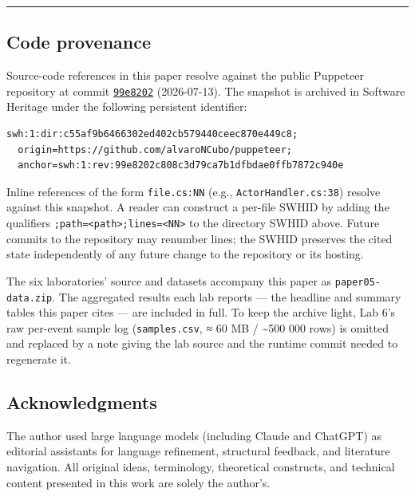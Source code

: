 \documentclass[
]{article}
\begin{document}
\begin{center}\rule{0.5\linewidth}{0.5pt}\end{center}

\subsection{Code provenance}\label{code-provenance}

Source-code references in this paper resolve against the public
Puppeteer repository at commit
\href{https://github.com/alvaroNCubo/puppeteer/tree/99e8202c808c3d79ca7b1dfbdae0ffb7872c940e}{\texttt{99e8202}}
(2026-07-13). The snapshot is archived in Software Heritage under the
following persistent identifier:

\begin{verbatim}
swh:1:dir:c55af9b6466302ed402cb579440ceec870e449c8;
  origin=https://github.com/alvaroNCubo/puppeteer;
  anchor=swh:1:rev:99e8202c808c3d79ca7b1dfbdae0ffb7872c940e
\end{verbatim}

Inline references of the form \texttt{file.cs:NN} (e.g.,
\texttt{ActorHandler.cs:38}) resolve against this snapshot. A reader can
construct a per-file SWHID by adding the qualifiers
\texttt{;path=\textless{}path\textgreater{};lines=\textless{}NN\textgreater{}}
to the directory SWHID above. Future commits to the repository may
renumber lines; the SWHID preserves the cited state independently of any
future change to the repository or its hosting.

The six laboratories' source and datasets accompany this paper as
\texttt{paper05-data.zip}. The aggregated results each lab reports ---
the headline and summary tables this paper cites --- are included in
full. To keep the archive light, Lab 6's raw per-event sample log
(\texttt{samples.csv}, ≈ 60 MB / \textasciitilde500 000 rows) is omitted
and replaced by a note giving the lab source and the runtime commit
needed to regenerate it.

\subsection{Acknowledgments}\label{acknowledgments}

The author used large language models (including Claude and ChatGPT) as
editorial assistants for language refinement, structural feedback, and
literature navigation. All original ideas, terminology, theoretical
constructs, and technical content presented in this work are solely the
author's.
\end{document}
